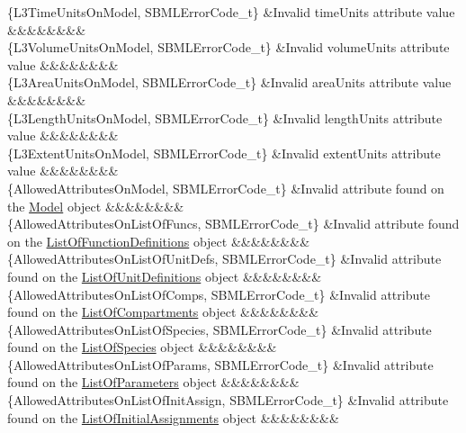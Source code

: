 \begin{DoxyParagraph}{}
\begin{longtabu}
\{L3\+Time\+Units\+On\+Model, S\+B\+M\+L\+Error\+Code\+\_\+t\} &Invalid \textquotesingle{}time\+Units\textquotesingle{} attribute value &&&&&&&&\\
\{L3\+Volume\+Units\+On\+Model, S\+B\+M\+L\+Error\+Code\+\_\+t\} &Invalid \textquotesingle{}volume\+Units\textquotesingle{} attribute value &&&&&&&&\\
\{L3\+Area\+Units\+On\+Model, S\+B\+M\+L\+Error\+Code\+\_\+t\} &Invalid \textquotesingle{}area\+Units\textquotesingle{} attribute value &&&&&&&&\\
\{L3\+Length\+Units\+On\+Model, S\+B\+M\+L\+Error\+Code\+\_\+t\} &Invalid \textquotesingle{}length\+Units\textquotesingle{} attribute value &&&&&&&&\\
\{L3\+Extent\+Units\+On\+Model, S\+B\+M\+L\+Error\+Code\+\_\+t\} &Invalid \textquotesingle{}extent\+Units\textquotesingle{} attribute value &&&&&&&&\\
\{Allowed\+Attributes\+On\+Model, S\+B\+M\+L\+Error\+Code\+\_\+t\} &Invalid attribute found on the \hyperlink{class_model}{Model} object &&&&&&&&\\
\{Allowed\+Attributes\+On\+List\+Of\+Funcs, S\+B\+M\+L\+Error\+Code\+\_\+t\} &Invalid attribute found on the \hyperlink{class_list_of_function_definitions}{List\+Of\+Function\+Definitions} object &&&&&&&&\\
\{Allowed\+Attributes\+On\+List\+Of\+Unit\+Defs, S\+B\+M\+L\+Error\+Code\+\_\+t\} &Invalid attribute found on the \hyperlink{class_list_of_unit_definitions}{List\+Of\+Unit\+Definitions} object &&&&&&&&\\
\{Allowed\+Attributes\+On\+List\+Of\+Comps, S\+B\+M\+L\+Error\+Code\+\_\+t\} &Invalid attribute found on the \hyperlink{class_list_of_compartments}{List\+Of\+Compartments} object &&&&&&&&\\
\{Allowed\+Attributes\+On\+List\+Of\+Species, S\+B\+M\+L\+Error\+Code\+\_\+t\} &Invalid attribute found on the \hyperlink{class_list_of_species}{List\+Of\+Species} object &&&&&&&&\\
\{Allowed\+Attributes\+On\+List\+Of\+Params, S\+B\+M\+L\+Error\+Code\+\_\+t\} &Invalid attribute found on the \hyperlink{class_list_of_parameters}{List\+Of\+Parameters} object &&&&&&&&\\
\{Allowed\+Attributes\+On\+List\+Of\+Init\+Assign, S\+B\+M\+L\+Error\+Code\+\_\+t\} &Invalid attribute found on the \hyperlink{class_list_of_initial_assignments}{List\+Of\+Initial\+Assignments} object &&&&&&&&\\

\end{longtabu}
\end{DoxyParagraph}
